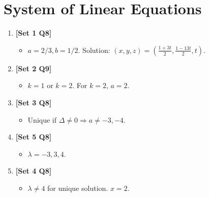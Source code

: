 \documentclass[12pt, a4paper]{article} %
\begin{document}
\section{System of Linear Equations}
\begin{enumerate}
    \item \textbf{[Set 1 Q8]}
    \begin{itemize}
        \item $a=2/3, b=1/2$. Solution: $(x, y, z) = (\frac{1+3t}{2}, \frac{1-13t}{2}, t)$.
    \end{itemize}

    \item \textbf{[Set 2 Q9]}
    \begin{itemize}
        \item $k=1$ or $k=2$. For $k=2$, $a=2$.
    \end{itemize}

    \item \textbf{[Set 3 Q8]}
    \begin{itemize}
        \item Unique if $\Delta \neq 0 \Rightarrow a \neq -3, -4$.
    \end{itemize}

    \item \textbf{[Set 5 Q8]}
    \begin{itemize}
        \item $\lambda = -3, 3, 4$.
    \end{itemize}

    \item \textbf{[Set 4 Q8]}
    \begin{itemize}
        \item $\lambda \neq 4$ for unique solution. $x = 2$.
    \end{itemize}
\end{enumerate}
\end{document}
